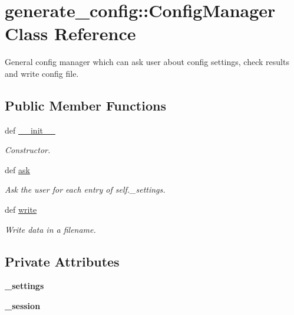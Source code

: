 \hypertarget{classgenerate__config_1_1ConfigManager}{
\section{generate\_\-config::ConfigManager Class Reference}
\label{classgenerate__config_1_1ConfigManager}
}
General config manager which can ask user about config settings, check results and write config file.  


\subsection*{Public Member Functions}
\begin{CompactItemize}
\item 
def \hyperlink{classgenerate__config_1_1ConfigManager_9d306a6d2e086a1dd9175423ad415798}{\_\-\_\-init\_\-\_\-}
\begin{CompactList}\small\item\em Constructor. \item\end{CompactList}\item 
\hypertarget{classgenerate__config_1_1ConfigManager_277e7238684d6750957bf2981e0eec14}{
def \hyperlink{classgenerate__config_1_1ConfigManager_277e7238684d6750957bf2981e0eec14}{ask}}
\label{classgenerate__config_1_1ConfigManager_277e7238684d6750957bf2981e0eec14}

\begin{CompactList}\small\item\em Ask the user for each entry of self.\_\-settings. \item\end{CompactList}\item 
def \hyperlink{classgenerate__config_1_1ConfigManager_50916dd9f4420c45c85048c3448dfd9e}{write}
\begin{CompactList}\small\item\em Write data in a filename. \item\end{CompactList}\end{CompactItemize}
\subsection*{Private Attributes}
\begin{CompactItemize}
\item 
\hypertarget{classgenerate__config_1_1ConfigManager_c7cc7bdff5ea3be7296ab6400ad0f61f}{
\textbf{\_\-settings}}
\label{classgenerate__config_1_1ConfigManager_c7cc7bdff5ea3be7296ab6400ad0f61f}

\item 
\hypertarget{classgenerate__config_1_1ConfigManager_4df37a3c3f5e0d781cf0344774e1eff0}{
\textbf{\_\-session}}
\label{classgenerate__config_1_1ConfigManager_4df37a3c3f5e0d781cf0344774e1eff0}

\end{CompactItemize}



